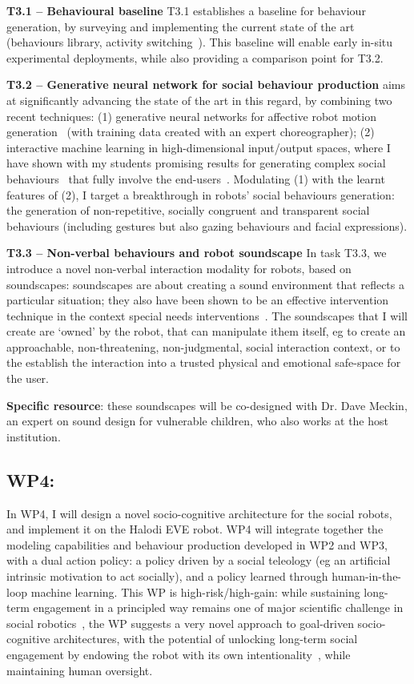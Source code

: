 \textbf{T3.1 -- Behavioural baseline} T3.1 establishes a baseline for behaviour
generation, by surveying and implementing the current state of the art
(behaviours library, activity switching~\cite{coninx2016towards}). This
baseline will enable early in-situ experimental deployments, while also
providing a comparison point for T3.2.

\textbf{T3.2 -- Generative neural network for social behaviour production}
\project aims at significantly advancing the state of the art in this regard, by
combining two recent techniques: (1) generative neural networks for affective
robot motion generation~\cite{marmpena2019generating,suguitan2020moveae} (with
training data created with an expert choreographer); (2) interactive machine
learning in high-dimensional input/output spaces, where I have shown with my
students promising results for generating complex social
behaviours~\cite{senft2019teaching, winkle2020couch} that fully involve the
end-users~\cite{winkle2018social}. Modulating (1) with the learnt features of
(2), I target a breakthrough in robots' social behaviours generation: the
generation of non-repetitive, socially congruent and transparent social
behaviours (including gestures but also gazing behaviours and facial
expressions).

\textbf{T3.3 -- Non-verbal behaviours and robot soundscape} In task T3.3, we
introduce a novel non-verbal interaction modality for robots, based on
soundscapes: soundscapes are about creating a sound environment that reflects a
particular situation; they also have been shown to be an effective intervention
technique in the context special needs
interventions~\cite{greher2010soundscape}. The soundscapes that I will create
are `owned' by the robot, that can manipulate ithem itself, eg to create an
approachable, non-threatening, non-judgmental, social interaction context, or to
the establish the interaction into a trusted physical and emotional safe-space
for the user.

\textbf{Specific resource}: these soundscapes will be co-designed with Dr.
Dave Meckin, an expert on sound design for vulnerable children, who also works
at the host institution.

\subsection{WP4: \textbf{\wpFour}}

In WP4, I will design a novel socio-cognitive architecture for the social
robots, and implement it on the Halodi EVE robot.  WP4 will integrate together the
modeling capabilities and behaviour production developed in WP2 and WP3, with a
dual action policy: a policy driven by a social teleology (eg an artificial
intrinsic motivation to act socially), and a policy learned through
human-in-the-loop machine learning. This WP is high-risk/high-gain: while sustaining
long-term engagement in a principled way remains one of major scientific
challenge in social robotics~\cite{hoffman2019anki}, the WP suggests a very novel
approach to goal-driven socio-cognitive architectures, with the potential of
unlocking long-term social engagement by endowing the robot with its own
intentionality~\cite{wiese2017robots}, while maintaining human oversight.

